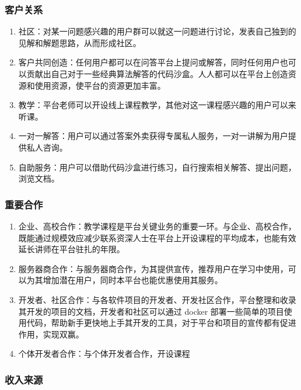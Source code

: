 \documentclass[a4paper]{ctexart}
\begin{document}
\subsubsection{客户关系}

\begin{enumerate}[label=\alph*.]
  \item 社区：对某一问题感兴趣的用户群可以就这一问题进行讨论，发表自己独到的见解和解题思路，从而形成社区。
  \item 客户共同创造：任何用户都可以在问答平台上提问或解答，同时任何用户也可以贡献出自己对于一些经典算法解答的代码沙盒。人人都可以在平台上创造资源和使用资源，使平台的资源更加丰富。
  \item 教学：平台老师可以开设线上课程教学，其他对这一课程感兴趣的用户可以来听课。
  \item 一对一解答：用户可以通过答案外卖获得专属私人服务，一对一讲解为用户提供私人咨询。
  \item 自助服务：用户可以借助代码沙盒进行练习，自行搜索相关解答、提出问题，浏览文档。
\end{enumerate}

\subsubsection{重要合作}

\begin{enumerate}[label=\alph*.]
  \item 企业、高校合作：教学课程是平台关键业务的重要一环。与企业、高校合作，既能通过规模效应减少联系资深人士在平台上开设课程的平均成本，也能有效延长讲师在平台驻扎的年限。
  \item 服务器商合作：与服务器商合作，为其提供宣传，推荐用户在学习中使用，可以为其增加潜在用户，同时本平台也能优惠使用其服务。
  \item 开发者、社区合作：与各软件项目的开发者、开发社区合作，平台整理和收录其开发的项目的文档，开发者和社区可以通过 docker 部署一些简单的项目使用代码，帮助新手更快地上手其开发的工具，对于平台和项目的宣传都有促进作用，实现双赢。
  \item 个体开发者合作：与个体开发者合作，开设课程
\end{enumerate}

\subsubsection{收入来源}
\end{document}
